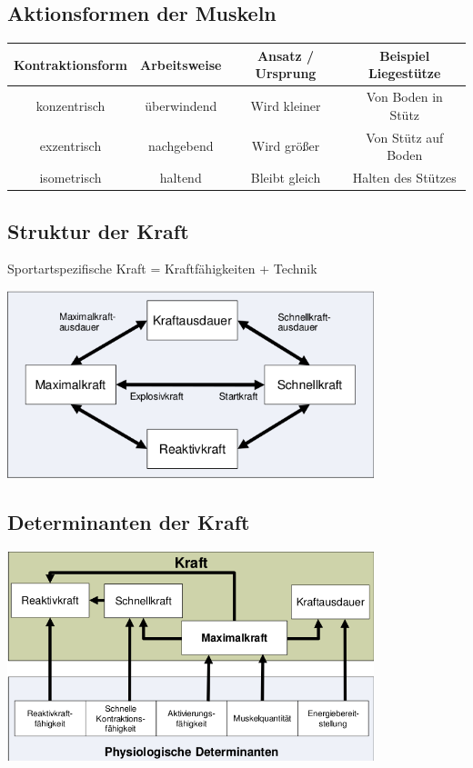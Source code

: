 \subsection{Aktionsformen der Muskeln}

\begin{tabular}{|c|c|c|c|}
 \hline
Kontraktionsform & Arbeitsweise & Ansatz / Ursprung & Beispiel Liegestütze \\ \hline \hline
konzentrisch & überwindend & Wird kleiner & Von Boden in Stütz \\ \hline
exzentrisch & nachgebend & Wird größer & Von Stütz auf Boden \\ \hline
isometrisch & haltend & Bleibt gleich & Halten des Stützes \\ \hline
\end{tabular}

\subsection{Struktur der Kraft}

Sportartspezifische Kraft = Kraftfähigkeiten + Technik

\includegraphics[width=0.8\textwidth]{pictures/kraftstruktur}

\subsection{Determinanten der Kraft}
\includegraphics[width=0.8\textwidth]{pictures/kraft_determinanten}

